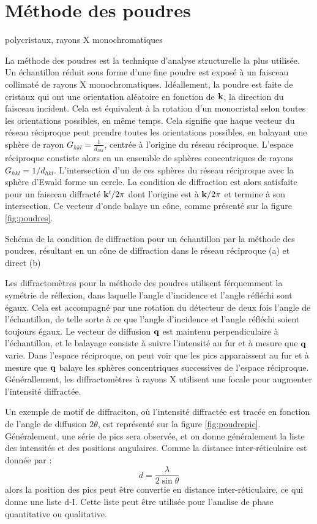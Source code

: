 \section{Méthode des poudres}
polycristaux, rayons X monochromatiques

La méthode des poudres est la technique d'analyse structurelle la plus utilisée. Un échantillon réduit sous forme d'une fine poudre est exposé à un faisceau collimaté de rayons X monochromatiques. Idéallement, la poudre est faite de cristaux qui ont une orientation aléatoire en fonction de $\mathbf{k}$, la direction du faisceau incident. Cela est équivalent à la rotation d'un monocristal selon toutes les orientations possibles, en même temps. Cela signifie que haque vecteur du réseau réciproque peut prendre toutes les orientations possibles, en balayant une sphère de rayon $G_{hkl} = \frac{1}{d_{hkl}}$, centrée à l'origine du réseau réciproque. L'espace réciproque constiste alors en un ensemble de sphères concentriques de rayons $G_{hkl} = 1/ d_{hkl}$. L'intersection d'un de ces sphères du réseau réciproque avec la sphère d'Ewald forme un cercle. La condition de diffraction est alors satisfaite pour un faisceau diffracté $\mathbf{k'}/2\pi$ dont l'origine est à $\mathbf{k}/2\pi$ et termine à son intersection. Ce vecteur d'onde balaye un cône, comme présenté sur la figure \ref{fig:poudres}.

\begin{marginfigure}
    \TODO
    \caption{Schéma de la condition de diffraction pour un échantillon par la méthode des poudres, résultant en un cône de diffraction dans le réseau réciproque (a) et direct (b)}
    \label{fig:poudres}
\end{marginfigure}

Les diffractomètres pour la méthode des poudres utilisent férquemment la symétrie de réflexion, dans laquelle l'angle d'incidence et l'angle réfléchi sont égaux. Cela est accompagné par une rotation du détecteur de deux fois l'angle de l'échantillon, de telle sorte à ce que l'angle d'incidence et l'angle réfléchi soient toujours égaux. Le vecteur de diffusion $\mathbf{q}$ est maintenu perpendiculaire à l'échantillon, et le balayage consiste à suivre l'intensité au fur et à mesure que $\mathbf{q}$ varie. Dans l'espace réciproque, on peut voir que les pics apparaissent au fur et à mesure que $\mathbf{q}$ balaye les sphères concentriques successives de l'espace réciproque.
Générallement, les diffractomètres à rayons X utilisent une focale pour augmenter l'intensité diffractée.

Un exemple de motif de diffraciton, où l'intensité diffractée est tracée en fonction de l'angle de diffusion $2\theta$, est représenté sur la figure \ref{fig:poudrepic}. Généralement, une série de pics sera observée, et on donne généralement la liste des intensités et des positions angulaires. Comme la distance inter-réticulaire est donnée par :
\begin{equation}
    d = \frac{\lambda}{2\sin\theta}
\end{equation}
 alors la position des pics peut être convertie en distance inter-réticulaire, ce qui donne une liste d-I. Cette liste peut être utilisée pour l'analise de phase quantitative ou qualitative.

